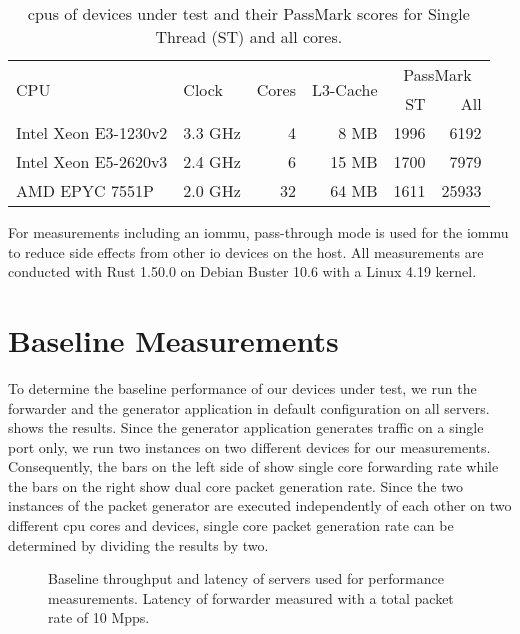 \begin{table}
    \centering
    \begin{tabular}{l|l|r|r|r|r}
        \multirow{2}{*}{CPU} & \multirow{2}{*}{Clock} & \multirow{2}{*}{Cores} &
        \multirow{2}{*}{L3-Cache} & \multicolumn{2}{c}{PassMark} \\
        & & & & ST & All \\ \hline

        Intel Xeon E3-1230v2 & 3.3 GHz &  4 &  8 MB & 1996 &  6192 \\ \hline
        Intel Xeon E5-2620v3 & 2.4 GHz &  6 & 15 MB & 1700 &  7979 \\ \hline
        AMD EPYC 7551P       & 2.0 GHz & 32 & 64 MB & 1611 & 25933 \\
    \end{tabular}

    \caption{\acsp{cpu} of devices under test and their PassMark scores for
    Single Thread (ST) and all cores.}
    \label{tab:cpus}
\end{table}

For measurements including an \ac{iommu}, pass-through mode is used for the
\ac{iommu} to reduce side effects from other \ac{io} devices on the host. All
measurements are conducted with Rust 1.50.0 on Debian Buster 10.6 with a Linux
4.19 kernel.


\section{Baseline Measurements}
\label{sec:baseline_measurements}

To determine the baseline performance of our devices under test, we run the
forwarder and the generator application in default configuration on all servers.
 shows the results. Since the generator application
generates traffic on a single port only, we run two instances on two different
devices for our measurements. Consequently, the bars on the left side of
 show single core forwarding rate while the
bars on the right show dual core packet generation rate. Since the two instances
of the packet generator are executed independently of each other on two
different \ac{cpu} cores and devices, single core packet generation rate can be
determined by dividing the results by two.

\begin{figure}%
	\centering

    \caption{Baseline throughput and latency of servers used for performance
    measurements. Latency of forwarder measured with a total packet rate of 10
    Mpps.}
	\label{fig:baseline-perf}
\end{figure}


